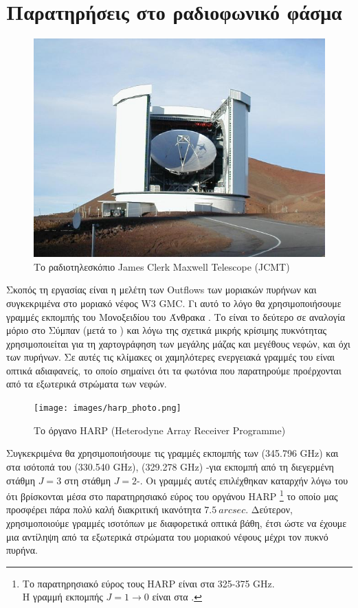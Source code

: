 \documentclass[a4paper,12pt]{memoir}
\begin{document}
\chapter{Παρατηρήσεις στο ραδιοφωνικό φάσμα}

\begin{figure}[hb]
	\centering
	\includegraphics[width=12cm]{images/JCMT.jpg}
	\caption{Το ραδιοτηλεσκόπιο James Clerk Maxwell Telescope (JCMT)}
\end{figure}

Σκοπός τη εργασίας είναι η μελέτη των Outflows των μοριακών πυρήνων και συγκεκριμένα στο μοριακό νέφος W3 GMC. Γι αυτό το λόγο θα χρησιμοποιήσουμε γραμμές εκπομπής του Μονοξειδίου του Άνθρακα . Το  είναι το δεύτερο σε αναλογία μόριο στο Σύμπαν (μετά το ) και λόγω της σχετικά μικρής κρίσιμης πυκνότητας χρησιμοποιείται για τη χαρτογράφηση των μεγάλης μάζας και μεγέθους νεφών, και όχι των πυρήνων. Σε αυτές τις κλίμακες οι χαμηλότερες ενεργειακά γραμμές του  είναι οπτικά αδιαφανείς, το οποίο σημαίνει ότι τα φωτόνια που παρατηρούμε προέρχονται από τα εξωτερικά στρώματα των νεφών.

\begin{figure}
	\begin{flushright}
		\texttt{[image: images/harp\_photo.png]}
		\caption{Το όργανο HARP (Heterodyne Array Receiver Programme)}
	\end{flushright}
\end{figure}


Συγκεκριμένα θα χρησιμοποιήσουμε τις γραμμές εκπομπής των  (345.796 GHz) και στα ισότοπά του  (330.540 GHz),  (329.278 GHz) -για εκπομπή από τη διεγερμένη στάθμη $J=3$ στη στάθμη $J=2$-. Οι γραμμές αυτές επιλέχθηκαν καταρχήν λόγω του ότι βρίσκονται μέσα στο παρατηρησιακό εύρος του οργάνου HARP \footnote{Το παρατηρησιακό εύρος τους HARP είναι στα 325-375 GHz. \\ Η γραμμή εκπομπής  $J=1\to 0$ είναι στα .} το οποίο μας προσφέρει πάρα πολύ καλή διακριτική ικανότητα $7.5\ arcsec$. Δεύτερον, χρησιμοποιούμε γραμμές ισοτόπων με διαφορετικά οπτικά βάθη, έτσι ώστε να έχουμε μια αντίληψη από τα εξωτερικά στρώματα του μοριακού νέφους μέχρι τον πυκνό πυρήνα.
\end{document}

